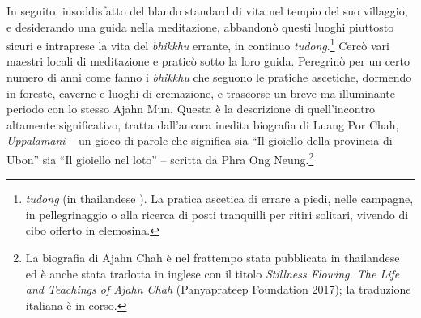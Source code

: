 In seguito, insoddisfatto del blando standard di vita nel tempio del suo
villaggio, e desiderando una guida nella meditazione, abbandonò questi
luoghi piuttosto sicuri e intraprese la vita del \emph{bhikkhu} errante,
in continuo \emph{tudong}.\footnote{\emph{tudong} (in thailandese
  ). La pratica ascetica di errare a piedi, nelle campagne, in
  pellegrinaggio o alla ricerca di posti tranquilli per ritiri solitari,
  vivendo di cibo offerto in elemosina.} Cercò vari maestri locali di
meditazione e praticò sotto la loro guida. Peregrinò per un certo numero
di anni come fanno i \emph{bhikkhu} che seguono le pratiche ascetiche,
dormendo in foreste, caverne e luoghi di cremazione, e trascorse un
breve ma illuminante periodo con lo stesso Ajahn Mun. Questa è la
descrizione di quell'incontro altamente significativo, tratta
dall'ancora inedita biografia di Luang Por Chah, \emph{Uppalamani} -- un
gioco di parole che significa sia ``Il gioiello della provincia di
Ubon'' sia ``Il gioiello nel loto'' -- scritta da Phra Ong
Neung.\footnote{La biografia di Ajahn Chah è nel frattempo stata
  pubblicata in thailandese ed è anche stata tradotta in inglese con il
  titolo \emph{Stillness Flowing. The Life and Teachings of Ajahn Chah}
  (Panyaprateep Foundation 2017); la traduzione italiana è in corso.}

